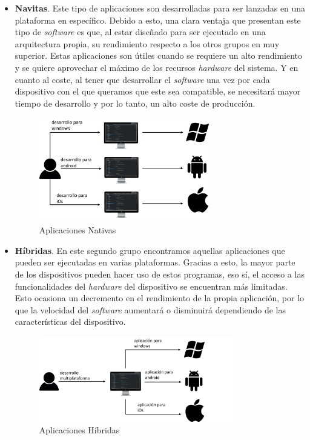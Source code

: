 \documentclass[../main.tex]{subfiles}
\begin{document}
\begin{itemize}

    \item \textbf{Navitas}. Este tipo de aplicaciones son desarrolladas para ser lanzadas en una plataforma en específico. Debido a esto, una clara ventaja que presentan este tipo de \textit{software} es que, al estar diseñado para ser ejecutado en una arquitectura propia, su rendimiento respecto a los otros grupos en muy superior. Estas aplicaciones son útiles cuando se requiere un alto rendimiento y se quiere aprovechar el máximo de los recursos \textit{hardware} del sistema. Y en cuanto al coste, al tener que desarrollar el \textit{software} una vez por cada dispositivo con el que queramos que este sea compatible, se necesitará mayor tiempo de desarrollo y por lo tanto, un alto coste de producción.
    
    \begin{figure}[!h]
          \centering
          \includegraphics[width=0.7\textwidth]{images/aplicaciones_nativas.png}
          \caption{Aplicaciones Nativas}
          \label{fig:aplicaciones_nativas}
      \end{figure}
    
    \item \textbf{Híbridas}. En este segundo grupo encontramos aquellas aplicaciones que pueden ser ejecutadas en varias plataformas. Gracias a esto, la mayor parte de los dispositivos pueden hacer uso de estos programas, eso sí, el acceso a las funcionalidades del \textit{hardware} del dispositivo se encuentran más limitadas. Esto ocasiona un decremento en el rendimiento de la propia aplicación, por lo que la velocidad del \textit{software} aumentará o disminuirá dependiendo de las características del dispositivo.
    
    \begin{figure}[!h]
          \centering
          \includegraphics[width=0.8\textwidth]{images/aplicaciones_hibridas.png}
          \caption{Aplicaciones Híbridas}
          \label{fig:aplicaciones_hibridas}
      \end{figure}
    

\end{itemize}
\end{document}
